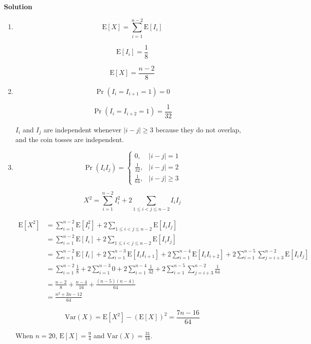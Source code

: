 \documentclass[a4paper]{article}
\newcommand{\solution}{\textbf{\large Solution}}
\newcommand{\E}{\mathrm{E}}
\newcommand{\Var}{\mathrm{Var}}
\begin{document}
\solution
\begin{enumerate}
    \item[(a)]
    
    $$
    \E[X] = \sum_{i=1}^{n-2} \E[I_i]
    $$

    $$
    \E[I_i] = \frac{1}{8}
    $$

    $$
    \E[X] = \frac{n-2}{8}
    $$

    \item[(b)]
    
    $$
    \Pr(I_i=I_{i+1}=1) = 0
    $$

    $$
    \Pr(I_i=I_{i+2}=1) = \frac{1}{32}
    $$

    $I_i$ and $I_j$ are independent whenever $|i-j|\ge3$ because they do not overlap, and the coin tosses are independent.

    \item[(c)]
    
    $$
    \Pr(I_i I_j)
    =
    \begin{cases}
        0, & \vert i-j \vert = 1 \\
        \frac{1}{32}, & \vert i-j \vert = 2 \\
        \frac{1}{64}, & \vert i-j \vert \ge 3
    \end{cases}
    $$

    $$
    X^2 = \sum_{i=1}^{n-2} I_i^2 + 2\sum_{1\le i<j\le n-2} I_i I_j
    $$

    $$
    \begin{aligned}
    \E[X^2]
    &= \sum_{i=1}^{n-2} \E[I_i^2] + 2\sum_{1\le i<j\le n-2} \E[I_i I_j] \\
    &= \sum_{i=1}^{n-2} \E[I_i] + 2\sum_{1\le i<j\le n-2} \E[I_i I_j] \\
    &=
    \sum_{i=1}^{n-2} \E[I_i]
    + 2\sum_{i=1}^{n-3} \E[I_i I_{i+1}]
    + 2\sum_{i=1}^{n-4} \E[I_i I_{i+2}]
    + 2\sum_{i=1}^{n-5} \sum_{j=i+3}^{n-2} \E[I_i I_j] \\
    &= \sum_{i=1}^{n-2} \frac{1}{8}
    + 2\sum_{i=1}^{n-3} 0
    + 2\sum_{i=1}^{n-4} \frac{1}{32}
    + 2\sum_{i=1}^{n-5} \sum_{j=i+3}^{n-2} \frac{1}{64} \\
    &= \frac{n-2}{8} + \frac{n-4}{16} + \frac{(n-5)(n-4)}{64} \\
    &= \frac{n^2+3n-12}{64}
    \end{aligned}
    $$

    $$
    \Var(X) = \E[X^2] - (\E[X])^2 = \frac{7n - 16}{64}
    $$

    When $n = 20$, $\E[X] = \frac{9}{4}$ and $\Var(X) = \frac{31}{16}$.
\end{enumerate}
\end{document}
